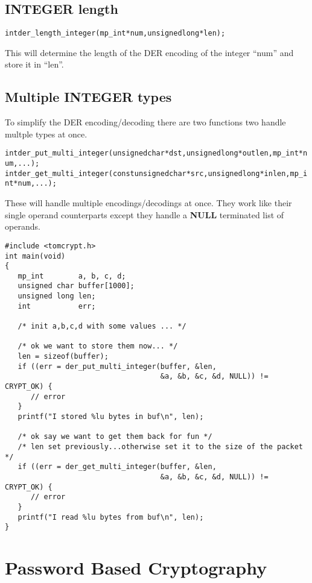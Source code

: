 \documentclass[a4paper]{book}
\begin{document}
\subsection{INTEGER length}
\begin{alltt}
int der_length_integer(mp_int *num, unsigned long *len);
\end{alltt}
This will determine the length of the DER encoding of the integer ``num'' and store it in ``len''.

\subsection{Multiple INTEGER types}
To simplify the DER encoding/decoding there are two functions two handle multple types at once.

\begin{alltt}
int der_put_multi_integer(unsigned char *dst, unsigned long *outlen, mp_int *num, ...);
int der_get_multi_integer(const unsigned char *src, unsigned long *inlen,  mp_int *num, ...);
\end{alltt}

These will handle multiple encodings/decodings at once.  They work like their single operand counterparts
except they handle a \textbf{NULL} terminated list of operands.

\begin{verbatim}
#include <tomcrypt.h>
int main(void)
{
   mp_int        a, b, c, d;
   unsigned char buffer[1000];
   unsigned long len;
   int           err;

   /* init a,b,c,d with some values ... */

   /* ok we want to store them now... */
   len = sizeof(buffer);
   if ((err = der_put_multi_integer(buffer, &len, 
                                    &a, &b, &c, &d, NULL)) != CRYPT_OK) {
      // error
   }
   printf("I stored %lu bytes in buf\n", len);

   /* ok say we want to get them back for fun */
   /* len set previously...otherwise set it to the size of the packet */
   if ((err = der_get_multi_integer(buffer, &len,
                                    &a, &b, &c, &d, NULL)) != CRYPT_OK) {
      // error
   }
   printf("I read %lu bytes from buf\n", len);
}
\end{verbatim}
\section{Password Based Cryptography}
\end{document}
